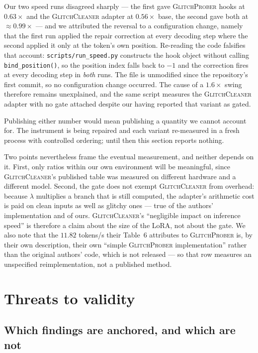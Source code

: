\documentclass[11pt,a4paper]{article}
\newcommand{\gp}{\textsc{GlitchProber}}
\newcommand{\gc}{\textsc{GlitchCleaner}}
\begin{document}
Our two speed runs disagreed sharply --- the first gave \gp{} hooks at $0.63\times$
and the \gc{} adapter at $0.56\times$ base, the second gave both at $\approx
0.99\times$ --- and we attributed the reversal to a configuration change, namely
that the first run applied the repair correction at every decoding step where the
second applied it only at the token's own position. Re-reading the code
falsifies that account: \texttt{scripts/run\_speed.py} constructs the hook object
without calling \texttt{bind\_position()}, so the position index falls back to
$-1$ and the correction fires at every decoding step in \emph{both} runs. The file
is unmodified since the repository's first commit, so no configuration change
occurred. The cause of a $1.6\times$ swing therefore remains unexplained, and the
same script measures the \gc{} adapter with no gate attached despite our having
reported that variant as gated.

Publishing either number would mean publishing a quantity we cannot account for.
The instrument is being repaired and each variant re-measured in a fresh process
with controlled ordering; until then this section reports nothing.

Two points nevertheless frame the eventual measurement, and neither depends on it.
First, only ratios within our own environment will be meaningful, since \gc{}'s
published table was measured on different hardware and a different model. Second,
the gate does not exempt \gc{} from overhead: because $\lambda$ multiplies a branch
that is still computed, the adapter's arithmetic cost is paid on clean inputs as
well as glitchy ones --- true of the authors' implementation and of ours. \gc{}'s
``negligible impact on inference speed'' is therefore a claim about the size of the
LoRA, not about the gate. We also note that the $11.82$ tokens/s their Table~6
attributes to \gp{} is, by their own description, their own ``simple \gp{}
implementation'' rather than the original authors' code, which is not released ---
so that row measures an unspecified reimplementation, not a published method.

\section{Threats to validity}
\label{sec:threats}

\subsection{Which findings are anchored, and which are not}
\end{document}
